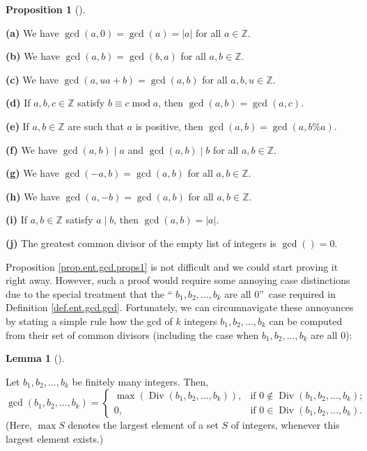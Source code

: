 \documentclass[numbers=enddot,12pt,final,onecolumn,notitlepage]{scrartcl}%
\numberwithin{exer}{subsection}
\theoremstyle{definition}
\newtheorem{lem}[theo]{Lemma}
\newenvironment{lemma}[1][]
{\begin{lem}[#1]\begin{leftbar}}
{\end{leftbar}\end{lem}}
\newtheorem{prop}[theo]{Proposition}
\newenvironment{proposition}[1][]
{\begin{prop}[#1]\begin{leftbar}}
{\end{leftbar}\end{prop}}
\begin{document}
\begin{proposition}
\label{prop.ent.gcd.props1}\textbf{(a)} We have $\gcd\left(  a,0\right)
=\gcd\left(  a\right)  =\left\vert a\right\vert $ for all $a\in\mathbb{Z}$.

\textbf{(b)} We have $\gcd\left(  a,b\right)  =\gcd\left(  b,a\right)  $ for
all $a,b\in\mathbb{Z}$.

\textbf{(c)} We have $\gcd\left(  a,ua+b\right)  =\gcd\left(  a,b\right)  $
for all $a,b,u\in\mathbb{Z}$.

\textbf{(d)} If $a,b,c\in\mathbb{Z}$ satisfy $b\equiv c\operatorname{mod}a$,
then $\gcd\left(  a,b\right)  =\gcd\left(  a,c\right)  $.

\textbf{(e)} If $a,b\in\mathbb{Z}$ are such that $a$ is positive, then
$\gcd\left(  a,b\right)  =\gcd\left(  a,b\%a\right)  $.

\textbf{(f)} We have $\gcd\left(  a,b\right)  \mid a$ and $\gcd\left(
a,b\right)  \mid b$ for all $a,b\in\mathbb{Z}$.

\textbf{(g)} We have $\gcd\left(  -a,b\right)  =\gcd\left(  a,b\right)  $ for
all $a,b\in\mathbb{Z}$.

\textbf{(h)} We have $\gcd\left(  a,-b\right)  =\gcd\left(  a,b\right)  $ for
all $a,b\in\mathbb{Z}$.

\textbf{(i)} If $a,b\in\mathbb{Z}$ satisfy $a\mid b$, then $\gcd\left(
a,b\right)  =\left\vert a\right\vert $.

\textbf{(j)} The greatest common divisor of the empty list of integers is
$\gcd\left(  {}\right)  =0$.
\end{proposition}

Proposition \ref{prop.ent.gcd.props1} is not difficult and we could start
proving it right away. However, such a proof would require some annoying case
distinctions due to the special treatment that the \textquotedblleft%
$b_{1},b_{2},\ldots,b_{k}$ are all $0$\textquotedblright\ case required in
Definition \ref{def.ent.gcd.gcd}. Fortunately, we can circumnavigate these
annoyances by stating a simple rule how the gcd of $k$ integers $b_{1}%
,b_{2},\ldots,b_{k}$ can be computed from their set of common divisors
(including the case when $b_{1},b_{2},\ldots,b_{k}$ are all $0$):

\begin{lemma}
\label{lem.ent.gcd.through-Div}Let $b_{1},b_{2},\ldots,b_{k}$ be finitely many
integers. Then,%
\[
\gcd\left(  b_{1},b_{2},\ldots,b_{k}\right)  =%
\begin{cases}
\max\left(  \operatorname*{Div}\left(  b_{1},b_{2},\ldots,b_{k}\right)
\right)  , & \text{if }0\notin\operatorname*{Div}\left(  b_{1},b_{2}%
,\ldots,b_{k}\right)  ;\\
0, & \text{if }0\in\operatorname*{Div}\left(  b_{1},b_{2},\ldots,b_{k}\right)
.
\end{cases}
\]
(Here, $\max S$ denotes the largest element of a set $S$ of integers, whenever
this largest element exists.)
\end{lemma}
\end{document}
